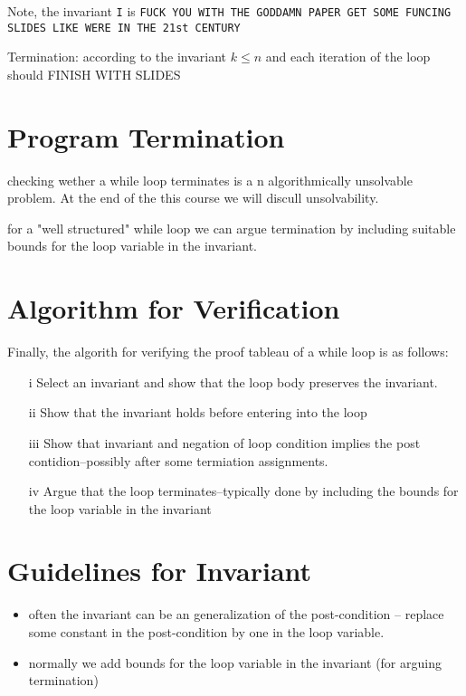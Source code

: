 \documentclass[12pt]{book}
\begin{document}
Note, the invariant \texttt{I} is \texttt{FUCK YOU WITH THE GODDAMN PAPER GET SOME FUNCING SLIDES LIKE WERE IN THE 21st CENTURY}

Termination: according to the invariant $k \leq n$ and each iteration of the loop should FINISH WITH SLIDES

\section*{Program Termination}
checking wether a while loop terminates is a n algorithmically unsolvable problem. At the end of the this course we
will discull unsolvability.

for a "well structured" while loop we can argue termination by including suitable bounds for the loop variable in
the invariant.

\section*{Algorithm for Verification}
Finally, the algorith for verifying the proof tableau of a while loop is as follows:
\begin{enumerate}
        \item[i] Select an invariant and show that the loop body preserves the invariant.
        \item[ii] Show that the invariant holds before entering into the loop
        \item[iii] Show that invariant and negation of loop condition implies the post contidion--possibly
                after some termiation assignments.
        \item[iv] Argue that the loop terminates--typically done by including the bounds for the loop
                variable in the invariant
\end{enumerate}

\section*{Guidelines for Invariant}
\begin{itemize}
        \item often the invariant can be an generalization of the post-condition -- replace some constant in the post-condition by 
                one in the loop variable.
        \item normally we add bounds for the loop variable in the invariant (for arguing termination)
\end{itemize}
\end{document}

